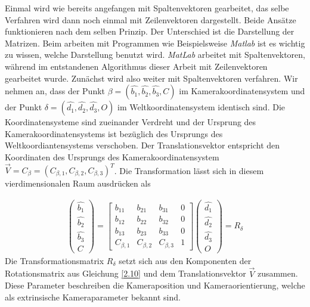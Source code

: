 Einmal wird wie bereits angefangen mit Spaltenvektoren gearbeitet, das selbe Verfahren wird dann noch einmal mit Zeilenvektoren dargestellt.  Beide Ansätze funktionieren nach dem selben Prinzip. Der Unterschied ist die Darstellung der Matrizen. Beim arbeiten mit Programmen wie Beispielsweise \textit{Matlab} ist es wichtig zu wissen, welche Darstellung benutzt wird. \textit{MatLab} arbeitet mit Spaltenvektoren, während im entstandenen Algorithmus dieser Arbeit mit Zeilenvektoren gearbeitet wurde. Zunächst wird also weiter mit Spaltenvektoren verfahren. 
Wir nehmen an, dass der Punkt  $\beta = (\hat{b_1},\hat{b_2},\hat{b_3},C)$ im Kamerakoordinatensystem und der Punkt $\delta = (\hat{d_1},\hat{d_2},\hat{d_3},O)$ im Weltkoordinatensystem identisch sind. Die Koordinatensysteme sind zueinander Verdreht und der Ursprung des Kamerakoordinatensystems ist bezüglich des Ursprungs des Weltkoordiantensystems verschoben. Der Translationsvektor entspricht den Koordinaten des Ursprungs des Kamerakoordinatensystem $\vec{V} = C_\beta = (C_{\beta,1}, C_{\beta,2}, C_{\beta,3})^T$. Die Transformation lässt sich in diesem vierdimensionalen Raum ausdrücken als  

\begin{gather}
	\begin{pmatrix}
		\hat{b_1}\\
		\hat{b_2}\\
		\hat{b_3}\\
		C
	\end{pmatrix} = 
	\begin{bmatrix}
		b_{11} & b_{21} & b_{31} & 0\\
		b_{12} & b_{22} & b_{32} & 0\\
		b_{13} & b_{23} & b_{33} & 0\\
		C_{\beta,1} & C_{\beta,2} & C_{\beta,3} & 1 
	\end{bmatrix}
	\begin{pmatrix}
		\hat{d_1}\\
		\hat{d_2}\\
		\hat{d_3}\\
		O
	\end{pmatrix}
	= R_\delta
\end{gather}
Die Transformationsmatrix $R_\delta$ setzt sich aus den Komponenten der Rotationsmatrix aus Gleichung \ref{2.10} und dem Translationsvektor $\vec{V}$ zusammen. Diese Parameter beschreiben die Kameraposition und Kameraorientierung, welche als extrinsische Kameraparameter bekannt sind.    

